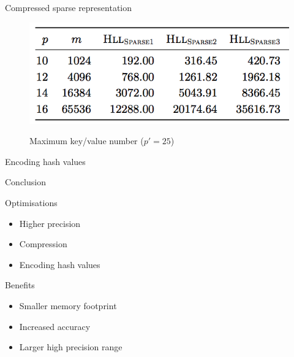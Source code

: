 \documentclass{beamer}
\begin{document}
\begin{frame}{Compressed sparse representation}


\begin{figure}[c]
\includegraphics [scale=0.45]  {sparse123.png}

Maximum key/value number ($p' = 25$)
\end{figure}

\end{frame}


\begin{frame}{Encoding hash values}
\end{frame}






\begin{frame}{Conclusion}


\begin{block}{Optimisations}
\begin{itemize}
\item Higher precision
\item Compression
\item Encoding hash values
\end{itemize}
\end{block}


\begin{block}{Benefits}
\begin{itemize}
\item Smaller memory footprint
\item Increased accuracy
\item Larger high precision range 
\end{itemize}
\end{block}



\end{frame}
\end{document}
